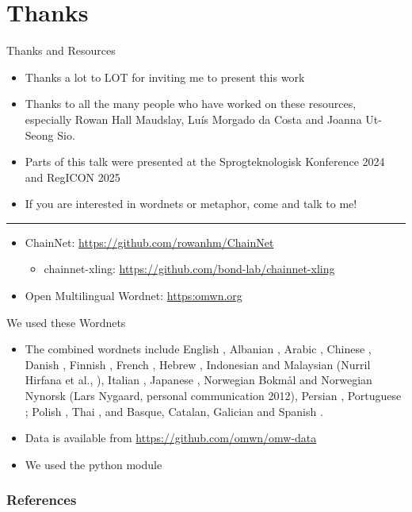 \documentclass[xetex]{beamer}  %
\begin{document}
\section{Thanks}

\begin{frame}{Thanks and Resources}

  \begin{itemize}
  \item Thanks a lot to LOT for inviting me to present this work
  \item Thanks to all the many people who have worked on these
    resources, especially  Rowan Hall Maudslay, Luís Morgado da Costa and Joanna Ut-Seong Sio.
   \item Parts of this talk were presented at the Sprogteknologisk Konference 2024 and RegICON 2025
  \item If you are interested in wordnets or metaphor, come and talk to me!
  \end{itemize}
  \medskip
  \hrule
  \medskip
  \begin{itemize}
  \item ChainNet: \url{https://github.com/rowanhm/ChainNet}
    \begin{itemize}
    \item chainnet-xling: \url{https://github.com/bond-lab/chainnet-xling}
    \end{itemize}
  \item Open Multilingual Wordnet: \url{https:omwn.org}
  \end{itemize}

  
\end{frame}

\begin{frame}{We used these Wordnets}
  \begin{itemize}
  \item The combined wordnets include 
English \citep{_Fellbaum:1998}, 
Albanian \citep{Ruci:2008}, 
Arabic \citep{Black:Elkateb:Rodriguez:Alkhalifa:Vossen:Pease:Bertran:Fellbaum:2006}, 
Chinese \citep{Huang:Hsieh:Hong:Chen:Su:Chen:Huang:2010}, 
Danish \citep{Pedersen:2009}, 
Finnish \citep{Linden:Carlson:2010}, 
French \citep{Sagot:Fiser:2008}, 
Hebrew \citep{Ordan:Wintner:2007},
Indonesian and Malaysian (Nurril Hirfana et al., \citeyear{Noor:Sapuan:Bond:2011}), 
Italian \citep{Pianta:Bentivogli:Girardi:2002,Toral:Bracale:Monachini:Soria:2010}, 
Japanese \citep{Isahara:Bond:Uchimoto:Utiyama:Kanzaki:2008}, 
Norwegian Bokm\r{a}l and Norwegian Nynorsk (Lars Nygaard, personal communication 2012),
Persian \citep{Montazery:Faili:2010}, 
Portuguese \citep{Paiva:Rademaker:2012};
Polish \citep{Piasecki:Szpakowicz:Broda:2009}, 
Thai \citep{Thoongsup:Charoenporn:Robkop:Sinthurahat:Mokarat:Sornlertlamvanich:Isahara:2009},
and Basque, Catalan, Galician and Spanish \citep{Gonzalez-Agirre:Laparra:Rigau:2012}.
\item Data is available from \url{https://github.com/omwn/omw-data}
\item We used the python  module \citep{Goodman:Bond:2021}
\end{itemize}
\end{frame}

\begin{frame}[allowframebreaks]
        \frametitle{References}
        
        
\end{frame}
\end{document}
